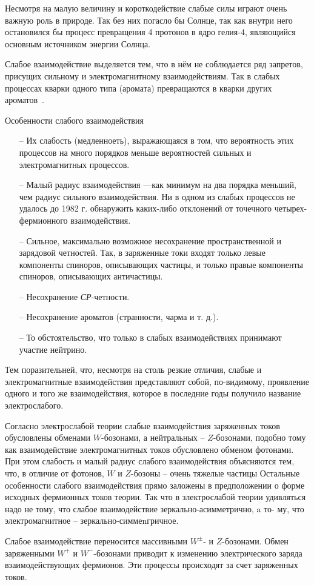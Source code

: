 Несмотря на малую величину и короткодействие слабые силы играют очень важную роль в природе. Так без них погасло бы Солнце, так как внутри него остановился бы процесс превращения 4 протонов в ядро гелия-4, являющийся основным источником энергии Солнца.

Слабое взаимодействие выделяется тем, что в нём не соблюдается ряд запретов, присущих сильному и электромагнитному взаимодействиям. Так в слабых процессах кварки одного типа (аромата) превращаются в кварки других ароматов~\cite{nuclphys:weak}.

Особенности слабого взаимодействия

\begin{itemize}
	\item[--] Их слабость (медленноеть), выражающаяся в том, что
	вероятность этих процессов на много порядков меньше
	вероятностей сильных и электромагнитных процессов.
	
	\item[--] Малый радиус взаимодействия —как минимум на
	два порядка меньший, чем радиус сильного взаимодействия.
	Ни в одном из слабых процессов не удалось до 1982 г. обнаружить каких-либо отклонений от точечного четырех-
	фермионного взаимодействия.
	
	\item[--] Сильное, максимально возможное несохранение пространственной и зарядовой четностей. Так, в заряженные
	токи входят только левые компоненты спиноров, описывающих частицы, и только правые компоненты спиноров,
	описывающих античастицы.
	
	\item[--] Несохранение \textit{СР}-четности.
	
	\item[--] Несохранение ароматов (странности, чарма и т. д.).
	
	\item[--]  То обстоятельство, что только в слабых взаимодействиях принимают участие нейтрино.
	
\end{itemize}

Тем поразительней, что, несмотря на столь резкие отличия, слабые и электромагнитные взаимодействия представляют собой, по-видимому, проявление одного и того же
взаимодействия, которое в последние годы получило название электрослабого.

Согласно электрослабой теории слабые взаимодействия
заряженных токов обусловлены обменами $W$-бозонами, а
нейтральных -- $Z$-бозонами, подобно тому как взаимодействие электромагнитных токов обусловлено обменом фотонами. При этом слабость и малый радиус слабого взаимодействия объясняются тем, что, в отличие от фотонов, $W$ и $Z$-бозоны -- очень тяжелые частицы Остальные особенности слабого взаимодействия прямо заложены в предположении о форме исходных фермионных токов теории.
Так что в злектрослабой теории удивляться надо не тому,
что слабое взаимодействие зеркально-асимметрично, a то-
му, что электромагнитное -- зеркально-симмеnгричное.

Слабое взаимодействие переносится массивными $W^±$- и $Z$-бозонами. Обмен заряженными $W^+$ и $W^-$-бозонами приводит к изменению электрического заряда взаимодействующих фермионов. Эти процессы происходят за счет заряженных токов.



